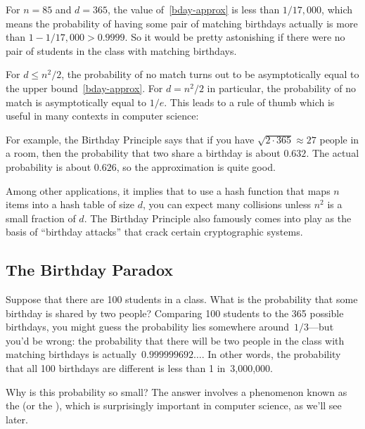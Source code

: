 For $n=85$ and $d = 365$, the value of~\eqref{bday-approx} is less
than $1/17,000$, which means the probability of having some pair of
matching birthdays actually is more than $1 - 1/17,000 > 0.9999$.  So
it would be pretty astonishing if there were no pair of students in
the class with matching birthdays.

For $d \leq n^2/2$, the probability of no match turns out to be
asymptotically equal to the upper bound~\eqref{bday-approx}.  For $d =
n^2/2$ in particular, the probability of no match is asymptotically
equal to $1/e$.  This leads to a rule of thumb which is useful in many
contexts in computer science:


For example, the Birthday Principle says that if you have $\sqrt{2
  \cdot 365} \approx 27$ people in a room, then the probability that
two share a birthday is about $0.632$.  The actual probability is
about $0.626$, so the approximation is quite good.

Among other applications, it implies that to use a hash function that
maps $n$ items into a hash table of size $d$, you can expect many
collisions unless $n^2$ is a small fraction of $d$.  The Birthday
Principle also famously comes into play as the basis of ``birthday
attacks'' that crack certain cryptographic systems.

\iffalse %

\subsection{The Birthday Paradox}\label{birthday_principle_sec}

Suppose that there are 100 students in a class.  What is the
probability that some birthday is shared by two people?  Comparing 100
students to the 365 possible birthdays, you might guess the
probability lies somewhere around~$1/3$---but you'd be wrong: the
probability that there will be two people in the class with matching
birthdays is actually~$0.999999692\dots$.  In other words, the
probability that all 100 birthdays are different is less than 1
in~3,000,000.

Why is this probability so small?  The answer involves a phenomenon
known as the  (or the ), which is surprisingly important in computer science, as
we'll see later.

